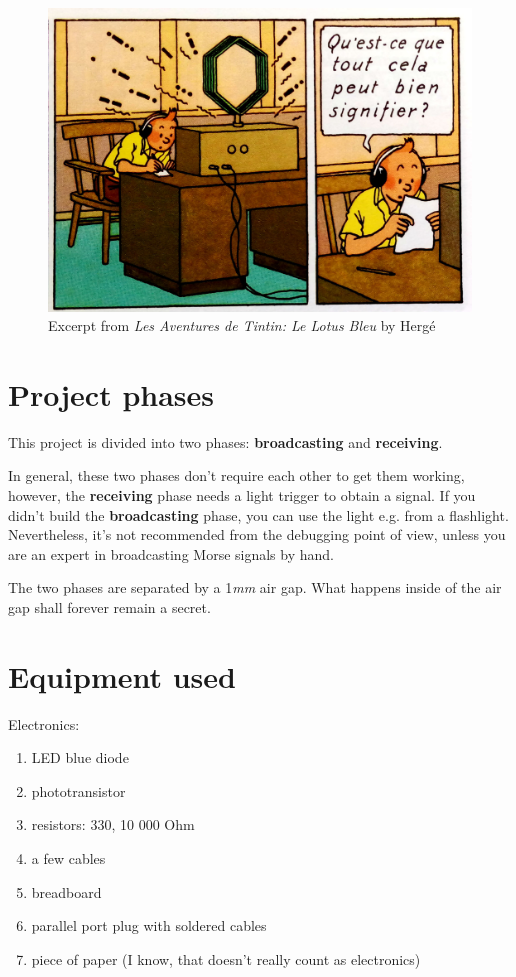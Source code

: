 \documentclass[12pt]{report}
\begin{document}
\begin{figure}[H]
\centering\includegraphics[scale=0.1]{le_lotus_bleu}
\caption{Excerpt from \textit{Les Aventures de Tintin: Le Lotus Bleu} by Hergé}			
\label{fig:tintin}
\end{figure}


\section{Project phases}

This project is divided into two phases: \textbf{broadcasting} and \textbf{receiving}. 

In general, these two phases don't require each other to get them working, however, the \textbf{receiving} phase needs a light trigger to obtain a signal. If you didn't build the  \textbf{broadcasting} phase, you can use the light e.g. from a flashlight. Nevertheless, it's not recommended from the debugging point of view, unless you are an expert in broadcasting Morse signals by hand.

The two phases are separated by a 1\textit{mm} air gap. What happens inside of the air gap shall forever remain a secret.

\section{Equipment used} \label{sec:equip}

Electronics:

\begin{enumerate}

\item LED blue diode
\item phototransistor
\item resistors: 330, 10 000 Ohm
\item a few cables
\item breadboard
\item parallel port plug with soldered cables
\item piece of paper (I know, that doesn't really count as electronics)

\end{enumerate}
\end{document}
